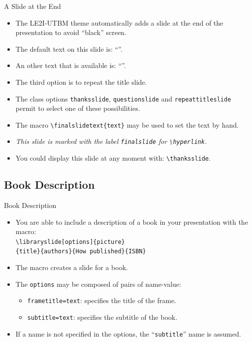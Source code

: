\documentclass[english,sectioncirclenumberstyle]{le2iutbmbeamer}
\begin{document}
\begin{frame}{A Slide at the End}
	\begin{itemize}
	\item The LE2I-UTBM theme automatically adds a slide at the end of the presentation to avoid ``black'' screen.
	\vfill
	\item The default text on this slide is: ``''.
	\item An other text that is available is: ``''.
	\item The third option is to repeat the title slide.
	\vfill
	\item The class options \texttt{thanksslide}, \texttt{questionslide} and \texttt{repeattitleslide} permit to select one of these possibilities.
	\vfill
	\item The macro \texttt{{\textbackslash}finalslidetext\{text\}} may be used to set the text by hand.
	\vfill
	\item \emph{This slide is marked with the label \texttt{finalslide} for \texttt{{\textbackslash}hyperlink}.}
	\vfill
	\item You could display this slide at any moment with: \texttt{{\textbackslash}thanksslide}.
	\end{itemize}
\end{frame}

\subsection{Book Description}

\begin{frame}{Book Description}
	\begin{itemize}
	\item You are able to include a description of a book in your presentation with the macro: \\
		\texttt{{\textbackslash}libraryslide[options]\{picture\}} \\
		\texttt{\{title\}\{authors\}\{How published\}\{ISBN\}}
	\vspace{1em}
	\item The macro creates a slide for a book.
	\vspace{1em}
	\item The \texttt{options} may be composed of pairs of name-value:
		\begin{itemize}
		\item \texttt{frametitle=text}: specifies the title of the frame.
		\item \texttt{subtitle=text}: specifies the subtitle of the book.
		\end{itemize}
	\item If a name is not specified in the options, the ``\texttt{subtitle}'' name is assumed.
	\end{itemize}
\end{frame}
\end{document}
